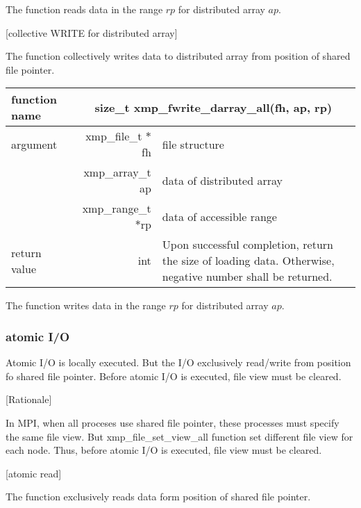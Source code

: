    The function reads data in the range $rp$ for distributed array $ap$.

   [collective WRITE for distributed array]

   The function collectively writes data to distributed array from
   position of shared file pointer.

   \begin{table}[h]
    \begin{center}
     \begin{tabular}{|l|r|p{80mm}|}
      \hline
      {\bf function name}  & \multicolumn{2}{c|}{\bf size\_t
      xmp\_fwrite\_darray\_all(fh, ap, rp)} \\ \hline
      argument & xmp\_file\_t $*$fh & file structure \\ \cline{2-3}
      & xmp\_array\_t ap & data of distributed array \\ \cline{2-3}
      & xmp\_range\_t $*$rp & data of accessible range \\ \hline
      return value & int & Upon successful completion, return the size
	      of loading data. Otherwise, negative number shall be
	      returned. \\ \hline
      \end{tabular}
     \end{center}
    \label{tb:aaa}
   \end{table}

   The function writes data in the range $rp$ for distributed array $ap$.

   \clearpage

   \subsubsection{atomic I/O}

   Atomic I/O is locally executed. But the I/O exclusively read/write
   from position fo shared file pointer. Before atomic I/O is executed,
   file view must be cleared.
   
   [Rationale]

   In MPI, when all proceses use shared file pointer, these processes
   must specify the same file view. But xmp\_file\_set\_view\_all
   function set different file view for each node.
   Thus, before atomic I/O is executed, file view must be cleared.

   [atomic read]

   The function exclusively reads data form position of shared file
   pointer.

